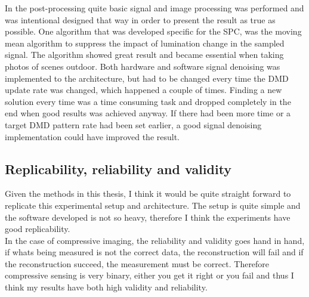In the post-processing quite basic signal and image processing was performed and was intentional designed that way in order to present the result as true as possible. One algorithm that was developed specific for the SPC, was the moving mean algorithm to suppress the impact of lumination change in the sampled signal. The algorithm showed great result and became essential when taking photos of scenes outdoor. Both hardware and software signal denoising was implemented to the architecture, but had to be changed every time the DMD update rate was changed, which happened a couple of times. Finding a new solution every time was a time consuming task and dropped completely in the end when good results was achieved anyway. If there had been more time or a target DMD pattern rate had been set earlier, a good signal denoising implementation could have improved the result.\\[0.1in]

\subsection{Replicability, reliability and validity}
Given the methods in this thesis, I think it would be quite straight forward to replicate this experimental setup and architecture. The setup is quite simple and the software developed is not so heavy, therefore I think the experiments have good replicability.\\[0.1in]

In the case of compressive imaging, the reliability and validity goes hand in hand, if whats being measured is not the correct data, the reconstruction will fail and if the reconstruction succeed, the measurement must be correct. Therefore compressive sensing is very binary, either you get it right or you fail and thus I think my results have both high validity and reliability.  

 





